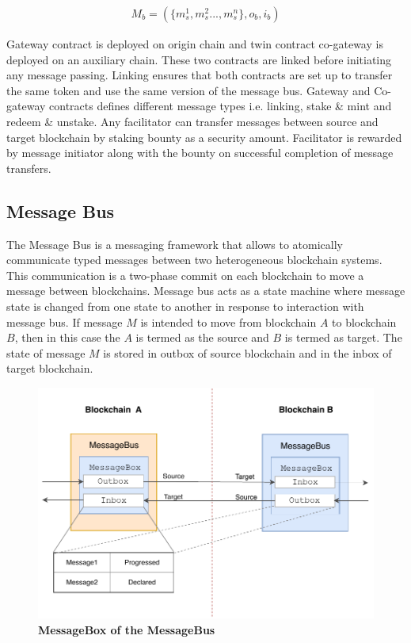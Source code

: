 \documentclass[12pt,a4paper]{article}
\begin{document}
\begin{align}
  M_b  = (\{ m^1_s,m^2_s ... ,m^n_s \}, o_b, i_b)
\end{align}


Gateway contract is deployed on origin chain and twin contract co-gateway is deployed on an auxiliary chain. 
These two contracts are linked before initiating any message passing. 
Linking ensures that both contracts are set up to transfer the same token and use the same version of the message bus. 
Gateway and Co-gateway contracts defines different message types i.e. linking, stake \& mint and redeem \& unstake. 
Any facilitator can transfer messages between source and target blockchain by staking bounty as a security amount. 
Facilitator is rewarded by message initiator along with the bounty on successful completion of message transfers. 
\subsection{Message Bus}\label{gateway:messagebus}
    
The Message Bus is a messaging framework that allows to atomically communicate typed messages between two heterogeneous blockchain systems. 
This communication is a two-phase commit on each blockchain to move a message between blockchains. 
Message bus acts as a state machine where message state is changed from one state to another in response to interaction with message bus. 
If message $M$ is intended to move from blockchain $A$ to blockchain $B$, then in this case the $A$ is termed as the source and $B$ is termed as target.
The state of message $M$ is stored in outbox of source blockchain and in the inbox of target blockchain.
\begin{figure}[htb]
    \centering
	\includegraphics[width=\textwidth]{messagebus}
	\caption{\textbf{MessageBox of the MessageBus}}
	\label{fig:messagebus}
\end{figure}
\end{document}
